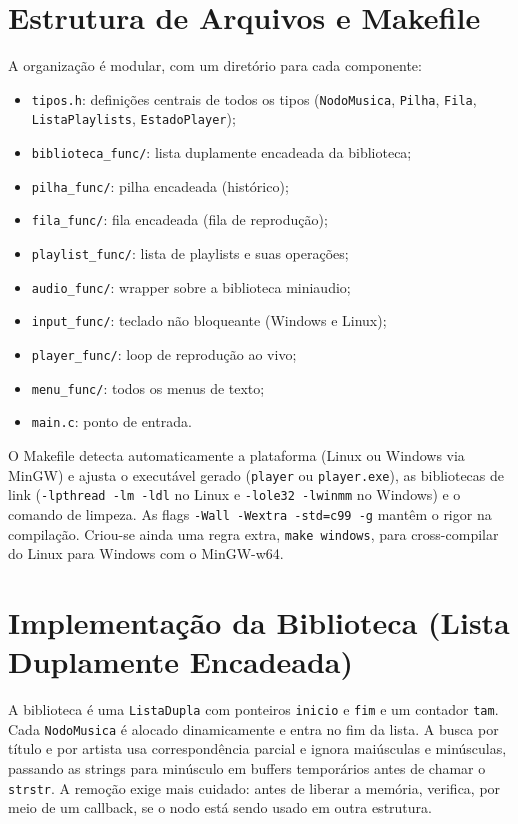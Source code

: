 \documentclass[
    12pt
    ,oneside
    ,a4paper
    ,chapter=TITLE
    ,section=TITLE
    ,sumario=abnt-6027-2012]{abntex2}
\begin{document}
\section{Estrutura de Arquivos e Makefile}

A organização é modular, com um diretório para cada componente:

\begin{itemize}
    \item \texttt{tipos.h}: definições centrais de todos os tipos (\texttt{NodoMusica}, \texttt{Pilha}, \texttt{Fila}, \texttt{ListaPlaylists}, \texttt{EstadoPlayer});
    \item \texttt{biblioteca\_func/}: lista duplamente encadeada da biblioteca;
    \item \texttt{pilha\_func/}: pilha encadeada (histórico);
    \item \texttt{fila\_func/}: fila encadeada (fila de reprodução);
    \item \texttt{playlist\_func/}: lista de playlists e suas operações;
    \item \texttt{audio\_func/}: wrapper sobre a biblioteca miniaudio;
    \item \texttt{input\_func/}: teclado não bloqueante (Windows e Linux);
    \item \texttt{player\_func/}: loop de reprodução ao vivo;
    \item \texttt{menu\_func/}: todos os menus de texto;
    \item \texttt{main.c}: ponto de entrada.
\end{itemize}

O Makefile detecta automaticamente a plataforma (Linux ou Windows via MinGW) e ajusta o executável gerado (\texttt{player} ou \texttt{player.exe}), as bibliotecas de link (\texttt{-lpthread -lm -ldl} no Linux e \texttt{-lole32 -lwinmm} no Windows) e o comando de limpeza. As flags \texttt{-Wall -Wextra -std=c99 -g} mantêm o rigor na compilação. Criou-se ainda uma regra extra, \texttt{make windows}, para cross-compilar do Linux para Windows com o MinGW-w64.

\section{Implementação da Biblioteca (Lista Duplamente Encadeada)}

A biblioteca é uma \texttt{ListaDupla} com ponteiros \texttt{inicio} e \texttt{fim} e um contador \texttt{tam}. Cada \texttt{NodoMusica} é alocado dinamicamente e entra no fim da lista. A busca por título e por artista usa correspondência parcial e ignora maiúsculas e minúsculas, passando as strings para minúsculo em buffers temporários antes de chamar o \texttt{strstr}. A remoção exige mais cuidado: antes de liberar a memória, verifica, por meio de um callback, se o nodo está sendo usado em outra estrutura.
\end{document}
